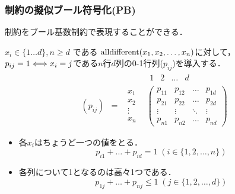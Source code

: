 \begin{frame}
    \frametitle{{\alldiff}制約の擬似ブール符号化(PB)}
    {\alldiff}制約をブール基数制約で表現することができる．
    \begin{exampleblock}{}
        $x_i \in \{ 1 \dots d \}, n \geq d$ である $\textrm{alldifferent}(x_1,x_2,\ldots,x_n)$に対して，$p_{ij}=1 \Longleftrightarrow x_i=j$である$n$行$d$列の0-1行列($p_{ij}$)を導入する．
        \vspace{-3mm}
        \begin{displaymath}
            \begin{array}{cccc}
             & & &
             \begin{array}{cccc}
                 1&2&\dots&d
             \end{array}\\
                (p_{ij})&=&
                \begin{array}{c}x_1\\ x_2\\ \vdots\\ x_n \end{array}&
                \left(
                    \begin{array}{cccc}
                        p_{11}&p_{12}&\dots&p_{1d}\\
                        p_{21}&p_{22}&\dots&p_{2d}\\
                        \vdots&\vdots&\ddots&\vdots\\
                        p_{n1}&p_{n2}&\dots&p_{nd}
                \end{array}\right)
            \end{array}
        \end{displaymath}
        \begin{itemize}
            \item 各$x_i$はちょうど一つの値をとる．
            \vspace{-3mm}
            $$ p_{i1} + \ldots + p_{id} = 1 \; (i \in \{1,2,\ldots,n\})$$
            \item 各列について1となるのは高々1つである．
            \vspace{-3mm}
            $$ p_{1j} + \ldots + p_{nj} \leq 1 \; (j \in \{1,2,\ldots,d\})$$
        \end{itemize}
    \end{exampleblock}
\end{frame}

